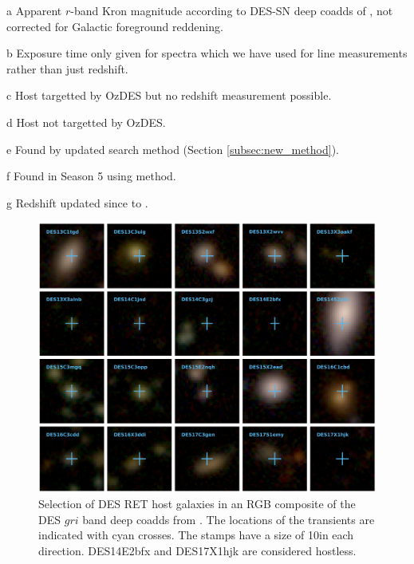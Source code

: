 \documentclass[fleqn,usenatbib,]{mnras}
\begin{document}
\begin{table}
\begin{threeparttable}
\begin{tabular}{llllllll}
\bottomrule
\end{tabular}
\begin{tablenotes}
\item[a] Apparent $r$-band Kron magnitude according to DES-SN deep coadds of , not corrected for Galactic foreground reddening.
\item[b] Exposure time only given for spectra which we have used for line measurements rather than just redshift.
\item[c] Host targetted by OzDES but no redshift measurement possible.
\item[d] Host not targetted by OzDES.
\item[e] Found by updated search method (Section \ref{subsec:new_method}).
\item[f] Found in Season 5 using  method.
\item[g] Redshift updated since to .
\end{tablenotes}
\end{threeparttable}
\label{tab:obs}
\end{table}

\begin{figure}
\includegraphics[width=\linewidth]{figs/RET_Mosaic.png}
\caption{Selection of DES RET host galaxies in an RGB composite of the DES $gri$ band deep coadds from . The locations of the transients are indicated with cyan crosses. The stamps have a size of 10\arcsec in each direction. DES14E2bfx and DES17X1hjk are considered hostless.
\label{fig:mosaic}}
\end{figure}
\end{document}
